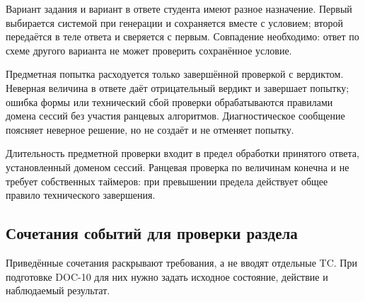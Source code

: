 \documentclass[12pt,a4paper]{article}
\begin{document}
\hypertarget{пояснения-к-вариантам-и-попытке}{}

Вариант задания и вариант в ответе студента имеют разное назначение. Первый выбирается системой при генерации и сохраняется вместе с условием; второй передаётся в теле ответа и сверяется с первым. Совпадение необходимо: ответ по схеме другого варианта не может проверить сохранённое условие.

Предметная попытка расходуется только завершённой проверкой с вердиктом. Неверная величина в ответе даёт отрицательный вердикт и завершает попытку; ошибка формы или технический сбой проверки обрабатываются правилами домена сессий без участия ранцевых алгоритмов. Диагностическое сообщение поясняет неверное решение, но не создаёт и не отменяет попытку.

Длительность предметной проверки входит в предел обработки принятого ответа, установленный доменом сессий. Ранцевая проверка по величинам конечна и не требует собственных таймеров: при превышении предела действует общее правило технического завершения.

\subsection{Сочетания событий для проверки раздела}\label{ux441ux43eux447ux435ux442ux430ux43dux438ux44f-ux441ux43eux431ux44bux442ux438ux439-ux434ux43bux44f-ux43fux440ux43eux432ux435ux440ux43aux438-ux440ux430ux437ux434ux435ux43bux430}

\hypertarget{сочетания-событий-для-проверки-раздела}{}

Приведённые сочетания раскрывают требования, а не вводят отдельные TC. При подготовке DOC-10 для них нужно задать исходное состояние, действие и наблюдаемый результат.
\end{document}
